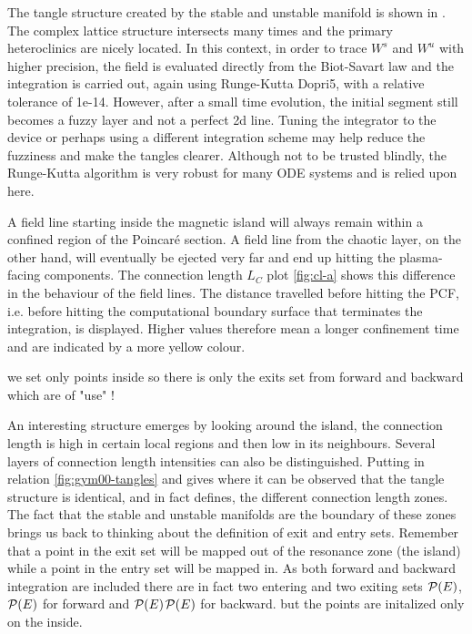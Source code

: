 The tangle structure created by the stable and unstable manifold is shown in . The complex lattice structure intersects many times and the primary heteroclinics are nicely located. In this context, in order to trace $W^s$ and $W^u$ with higher precision, the field is evaluated directly from the Biot-Savart law and the integration is carried out, again using Runge-Kutta Dopri5, with a relative tolerance of 1e-14. However, after a small time evolution, the initial segment still becomes a fuzzy layer and not a perfect 2d line. Tuning the integrator to the device or perhaps using a different integration scheme may help reduce the fuzziness and make the tangles clearer. Although not to be trusted blindly, the Runge-Kutta algorithm is very robust for many ODE systems and is relied upon here.

A field line starting inside the magnetic island will always remain within a confined region of the Poincaré section. A field line from the chaotic layer, on the other hand, will eventually be ejected very far and end up hitting the plasma-facing components. The connection length $L_C$ plot \ref{fig:cl-a} shows this difference in the behaviour of the field lines. The distance travelled before hitting the PCF, i.e. before hitting the computational boundary surface that terminates the integration, is displayed. Higher values therefore mean a longer confinement time and are indicated by a more yellow colour.

we set only points inside so there is only the exits set from forward and backward which are of "use" !

An interesting structure emerges by looking around the island, the connection length is high in certain local regions and then low in its neighbours. Several layers of connection length intensities can also be distinguished. Putting in relation \ref{fig:gym00-tangles} and  gives  where it can be observed that the tangle structure is identical, and in fact defines, the different connection length zones. The fact that the stable and unstable manifolds are the boundary of these zones brings us back to thinking about the definition of exit and entry sets. Remember that a point in the exit set will be mapped out of the resonance zone (the island) while a point in the entry set will be mapped in. As both forward and backward integration are included there are in fact two entering and two exiting sets $\mathcal{P}(E)$, $\mathcal{P}(E)$ for forward and $\mathcal{P}(E)$$\mathcal{P}(E)$ for backward. but the points are initalized only on the inside.

